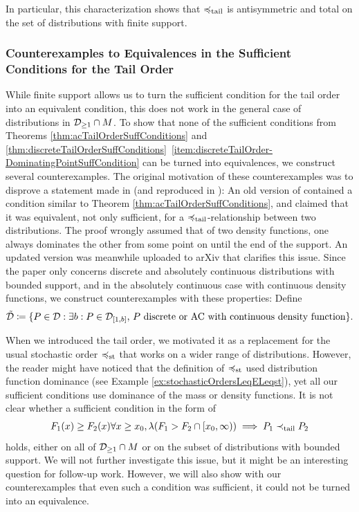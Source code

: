 \documentclass[a4paper]{scrreprt}
\newcommand{\M}{M}
\theoremstyle{definition}
\begin{document}
    In particular, this characterization shows that $\preccurlyeq_{\text{tail}}$ is antisymmetric and total on the set of distributions with finite support.
    
    \subsubsection{Counterexamples to Equivalences in the Sufficient Conditions for the Tail Order}
    \newcommand{\DRass}{\tilde{\DP}}
    While finite support allows us to turn the sufficient condition for the tail order into an equivalent condition, this does not work in the general case of distributions in $\Dgeqone \cap \M$.
    To show that none of the sufficient conditions from Theorems \ref{thm:acTailOrderSuffConditions} and \ref{thm:discreteTailOrderSuffConditions}\, \ref{item:discreteTailOrder-DominatingPointSuffCondition} can be turned into equivalences, we construct several counterexamples.
    The original motivation of these counterexamples was to disprove a statement made in \cite{bib:rassGameRiskManagI} (and reproduced in \cite{bib:rassTotalOrderingOnLossDistributions}): 
    An old version of \cite{bib:rassGameRiskManagI} contained a condition similar to Theorem \ref{thm:acTailOrderSuffConditions}, and claimed that it was equivalent, not only sufficient, for a $\preccurlyeq_{\text{tail}}$-relationship between two distributions. The proof wrongly assumed that of two density functions, one always dominates the other from some point on until the end of the support.
    An updated version was meanwhile uploaded to arXiv that clarifies this issue. Since the paper only concerns discrete and absolutely continuous distributions with bounded support, and in the absolutely continuous case with continuous density functions, we construct counterexamples with these properties: Define 
    \begin{gather*}
        \DRass \coloneqq \set{P \in \DP: \text{$\exists b: P \in \DP_{[1, b]}$, $P$ discrete or AC with continuous density function}}.
    \end{gather*}
    
    When we introduced the tail order, we motivated it as a replacement for the usual stochastic order $\preccurlyeq_{\text{st}}$ that works on a wider range of distributions.
    However, the reader might have noticed that the definition of $\preccurlyeq_{\text{st}}$ used distribution function dominance (see Example \ref{ex:stochasticOrdersLeqELeqst}), yet all our sufficient conditions use dominance of the mass or density functions.
    It is not clear whether a sufficient condition in the form of 
    \begin{gather*}
        F_1(x) \geq F_2(x) \forall x \geq x_0, \lambda({F_1 > F_2} \cap [x_0, \infty)) \implies P_1 \prec_{\text{tail}} P_2
    \end{gather*}
    holds, either on all of $\mathcal{D}_{\geq1} \cap M$ or on the subset of distributions with bounded support.
    We will not further investigate this issue, but it might be an interesting question for follow-up work.
    However, we will also show with our counterexamples that even such a condition was sufficient, it could not be turned into an equivalence.
    
\end{document}

